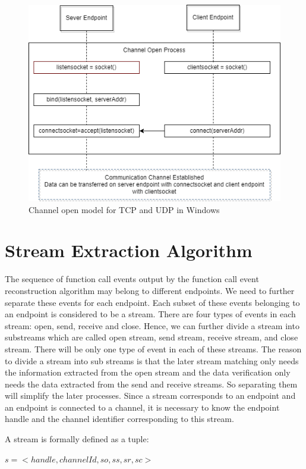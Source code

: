 \begin{figure}[H]
\centerline{\includegraphics[scale=0.6]{Figures/tcpudpchannelopen}}
 \caption{Channel open model for TCP and UDP in Windows}
\label{channelopen2}    
\end{figure}

\section{Stream Extraction Algorithm}
The sequence of function call events output by the function call event reconstruction algorithm may belong to different endpoints. We need to further separate these events for each endpoint. Each subset of these events belonging to an endpoint is considered to be a stream. There are four types of events in each stream: open, send, receive and close. Hence, we can further divide a stream into substreams which are called open stream, send stream, receive stream, and close stream. There will be only one type of event in each of these streams. The reason to divide a stream into sub streams is that the later stream matching only needs the information extracted from the open stream and the data verification only needs the data extracted from the send and receive streams. So separating them will simplify the later processes. Since a stream corresponds to an endpoint and an endpoint is connected to a channel, it is necessary to know the endpoint handle and the channel identifier corresponding to this stream. 

A stream is formally defined as a tuple:

$s = <handle, channelId, so, ss, sr, sc>$

